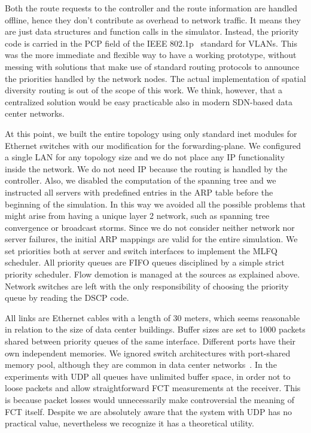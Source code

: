 Both the route requests to the controller and the route information are handled offline, hence they don't contribute as overhead to network traffic. It means they are just data structures and function calls in the simulator. Instead, the priority code is carried in the PCP field of the IEEE 802.1p~\cite{ek1999ieee} standard for VLANs. This was the more immediate and flexible way to have a working prototype, without messing with solutions that make use of standard routing protocols to announce the priorities handled by the network nodes. The actual implementation of spatial diversity routing is out of the scope of this work. We think, however, that a centralized solution would be easy practicable also in modern SDN-based data center networks.

At this point, we built the entire topology using only standard inet modules for Ethernet switches with our modification for the forwarding-plane. We configured a single LAN for any topology size and we do not place any IP functionality inside the network. We do not need IP because the routing is handled by the controller. Also, we disabled the computation of the spanning tree and we instructed all servers with predefined entries in the ARP table before the beginning of the simulation. In this way we avoided all the possible problems that might arise from having a unique layer 2 network, such as spanning tree convergence or broadcast storms. Since we do not consider neither network nor server failures, the initial ARP mappings are valid for the entire simulation. We set priorities both at server and switch interfaces to implement the MLFQ scheduler. All priority queues are FIFO queues disciplined by a simple strict priority scheduler. Flow demotion is managed at the sources as explained above. Network switches are left with the only responsibility of choosing the priority queue by reading the DSCP code.

All links are Ethernet cables with a length of 30 meters, which seems reasonable in relation to the size of data center buildings. Buffer sizes are set to 1000 packets shared between priority queues of the same interface. Different ports have their own independent memories. We ignored switch architectures with port-shared memory pool, although they are common in data center networks~\cite{dctcp, mqecn}.  In the experiments with UDP all queues have unlimited buffer space, in order not to loose packets and allow straightforward FCT measurements at the receiver. This is because packet losses would unnecessarily make controversial the meaning of FCT itself. Despite we are absolutely aware that the system with UDP has no practical value, nevertheless we recognize it has a theoretical utility.
